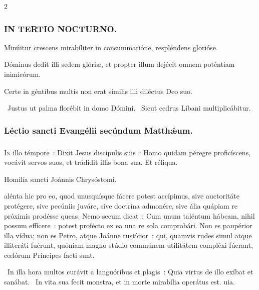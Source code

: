 \documentclass[9pt,twoside]{extarticle}
\begin{document}
\begin{multicols}{2}
{\subsubsection*{\center \textsc{IN TERTIO NOCTURNO.}}
\begin{tightlist}{}
\item {} Minúitur crescens mirabíliter in consummatióne, respléndens glorióse.
\item {} Dóminus dedit illi sedem glóriæ, et propter illum dejécit omnem poténtiam inimicórum.
\item {} Certe in géntibus multis non erat símilis illi diléctus Deo suo.
\item {}~Justus ut palma florébit in domo Dómini. ~Sicut cedrus Líbani multiplicábitur.
\end{tightlist}

\subsubsection*{\center Léctio sancti Evangélii secúndum Matthǽum.}
\subsubsection*{\center {} \hfill {}}
\lettrine{I}n illo témpore~: Dixit Jesus discípulis suis~: Homo quidam péregre proficíscens, vocávit servos suos, et trádidit illis bona sua. Et réliqua.

\begin{center}Homilía sancti Joánnis Chrysóstomi.\\
\end{center}
alénta hic pro eo, quod unusquísque fácere potest accípimus, sive auctoritáte protégere, sive pecúniis juváre, sive doctrína admonére, sive ália quápiam re próximis prodésse queas. Nemo secum dicat~: Cum unum taléntum hábeam, nihil possum effícere~: potest profécto ex ea una re sola comprobári. Non es paupérior illa vídua; non es Petro, atque Joánne rustícior~: qui, quamvis rudes simul atque illiteráti fuérunt, quóniam magno stúdio commúnem utilitátem compléxi fúerant, cœlórum Príncipes facti sunt.

\begin{tightlist}{}
\item {}~In illa hora multos curávit a languóribus et plagis~: \textred{*} Quia virtus de illo exíbat et sanábat. ~In vita sua fecit monstra, et in morte mirabília operátus est. uia.
\end{tightlist}

}
\end{multicols}
\end{document}
